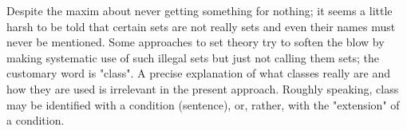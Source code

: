 Despite the maxim about never getting something for nothing; it seems a little harsh to be told that certain sets are not really sets and even their names must never be mentioned. Some approaches to set theory try to soften the blow by making systematic use of such illegal sets but just not calling them sets; the customary word is "class". A precise explanation of what classes really are and how they are used is irrelevant in the present approach. Roughly speaking, class may be identified with a condition (sentence), or, rather, with the "extension" of a condition.